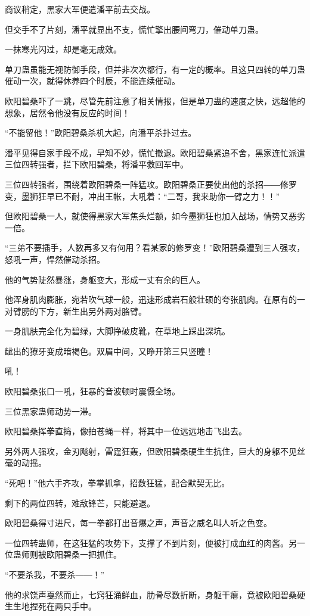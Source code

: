 \begin{this_body}
商议稍定，黑家大军便遣潘平前去交战。

但交手不了片刻，潘平就显出不支，慌忙擎出腰间弯刀，催动单刀蛊。

一抹寒光闪过，却是毫无成效。

单刀蛊虽能无视防御手段，但并非次次都行，有一定的概率。且这只四转的单刀蛊催动一次，就得休养四个时辰，不能连续催动。

欧阳碧桑吓了一跳，尽管先前注意了相关情报，但是单刀蛊的速度之快，远超他的想象，居然令他没有反应的时间！

“不能留他！”欧阳碧桑杀机大起，向潘平杀扑过去。

潘平见得自家手段不成，早知不妙，慌忙撤退。欧阳碧桑紧追不舍，黑家连忙派遣三位四转强者，拦下欧阳碧桑，将潘平救回军中。

三位四转强者，围绕着欧阳碧桑一阵猛攻。欧阳碧桑正要使出他的杀招――修罗变，墨狮狂早已不耐，冲出王帐，大吼着：“二哥，我来助你一臂之力！！”

但欧阳碧桑一人，就使得黑家大军焦头烂额，如今墨狮狂也加入战场，情势又恶劣一倍。

“三弟不要插手，人数再多又有何用？看某家的修罗变！”欧阳碧桑遭到三人强攻，怒吼一声，悍然催动杀招。

他的气势陡然暴涨，身躯变大，形成一丈有余的巨人。

他浑身肌肉膨胀，宛若吹气球一般，迅速形成岩石般壮硕的夸张肌肉。在原有的一对臂膀的下方，新生出另外两对胳臂。

一身肌肤完全化为碧绿，大脚挣破皮靴，在草地上踩出深坑。

龇出的獠牙变成暗褐色。双眉中间，又睁开第三只竖瞳！

吼！

欧阳碧桑张口一吼，狂暴的音波顿时震慑全场。

三位黑家蛊师动势一滞。

欧阳碧桑挥拳直捣，像拍苍蝇一样，将其中一位远远地击飞出去。

另外两人强攻，金刃飚射，雷霆狂轰，但欧阳碧桑硬生生抗住，巨大的身躯不见丝毫的动摇。

“死吧！”他六手齐攻，拳掌抓拿，招数狂猛，配合默契无比。

剩下的两位四转，难敌锋芒，只能避退。

欧阳碧桑得寸进尺，每一拳都打出音爆之声，声音之威名叫人听之色变。

一位四转蛊师，在这狂猛的攻势下，支撑了不到片刻，便被打成血红的肉酱。另一位蛊师则被欧阳碧桑一把抓住。

“不要杀我，不要杀――！”

他的求饶声戛然而止，七窍狂涌鲜血，肋骨尽数折断，身躯干瘪，竟被欧阳碧桑硬生生地捏死在两只手中。


\end{this_body}
